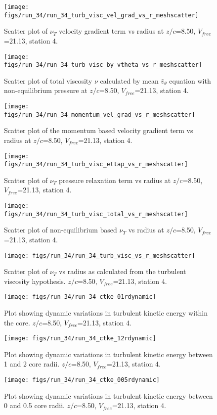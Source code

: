 \begin{figure}[H]
\centering
\texttt{[image: figs/run\_34/run\_34\_turb\_visc\_vel\_grad\_vs\_r\_meshscatter]}
\caption{Scatter plot of $\nu_T$ velocity gradient term vs radius at $z/c$=8.50, $V_{free}$=21.13, station 4.}
\end{figure}


\begin{figure}[H]
\centering
\texttt{[image: figs/run\_34/run\_34\_turb\_visc\_by\_vtheta\_vs\_r\_meshscatter]}
\caption{Scatter plot of total viscosity $\nu$ calculated by mean $\bar{v}_{\theta}$ equation with non-equilibrium pressure at $z/c$=8.50, $V_{free}$=21.13, station 4.}
\end{figure}


\begin{figure}[H]
\centering
\texttt{[image: figs/run\_34/run\_34\_momentum\_vel\_grad\_vs\_r\_meshscatter]}
\caption{Scatter plot of the momentum based velocity gradient term vs radius at $z/c$=8.50, $V_{free}$=21.13, station 4.}
\end{figure}


\begin{figure}[H]
\centering
\texttt{[image: figs/run\_34/run\_34\_turb\_visc\_ettap\_vs\_r\_meshscatter]}
\caption{Scatter plot of $\nu_T$ pressure relaxation term vs radius at $z/c$=8.50, $V_{free}$=21.13, station 4.}
\end{figure}


\begin{figure}[H]
\centering
\texttt{[image: figs/run\_34/run\_34\_turb\_visc\_total\_vs\_r\_meshscatter]}
\caption{Scatter plot of non-equilibrium based $\nu_T$ vs radius at $z/c$=8.50, $V_{free}$=21.13, station 4.}
\end{figure}


\begin{figure}[H]
\centering
\texttt{[image: figs/run\_34/run\_34\_turb\_visc\_vs\_r\_meshscatter]}
\caption{Scatter plot of $\nu_T$ vs radius as calculated from the turbulent viscosity hypothesis. $z/c$=8.50, $V_{free}$=21.13, station 4.}
\end{figure}


\begin{figure}[H]
\centering
\texttt{[image: figs/run\_34/run\_34\_ctke\_01rdynamic]}
\caption{Plot showing dynamic variations in turbulent kinetic energy within the core. $z/c$=8.50, $V_{free}$=21.13, station 4.}
\end{figure}


\begin{figure}[H]
\centering
\texttt{[image: figs/run\_34/run\_34\_ctke\_12rdynamic]}
\caption{Plot showing dynamic variations in turbulent kinetic energy between 1 and 2 core radii. $z/c$=8.50, $V_{free}$=21.13, station 4.}
\end{figure}


\begin{figure}[H]
\centering
\texttt{[image: figs/run\_34/run\_34\_ctke\_005rdynamic]}
\caption{Plot showing dynamic variations in turbulent kinetic energy between 0 and 0.5 core radii. $z/c$=8.50, $V_{free}$=21.13, station 4.}
\end{figure}


